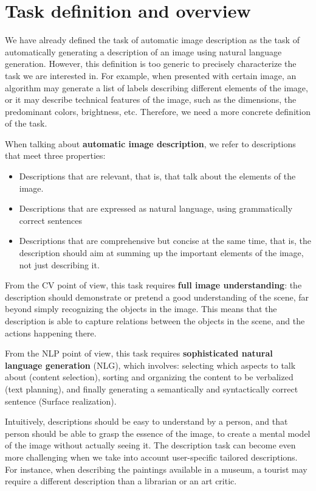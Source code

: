 \section{Task definition and overview}

We have already defined the task of automatic image description as the task of automatically generating a description of an image using natural language generation. However, this definition is too generic to precisely characterize the task we are interested in. For example, when presented with certain image, an algorithm may generate a list of labels describing different elements of the image, or it may describe technical features of the image, such as the dimensions, the predominant colors, brightness, etc. Therefore, we need a more concrete definition of the task.

When talking about \textbf{automatic image description}, we refer to descriptions that meet three properties:
\begin{itemize}
\item Descriptions that are relevant, that is, that talk about the elements of the image.
\item Descriptions that are expressed as natural language, using grammatically correct sentences
\item Descriptions that are comprehensive but concise at the same time, that is, the description should aim at summing up the important elements of the image, not just describing it.
\end{itemize}

From the CV point of view, this task requires \textbf{full image understanding}: the description should demonstrate or pretend a good understanding of the scene, far beyond simply recognizing the objects in the image. This means that the description is able to capture relations between the objects in the scene, and the actions happening there.

From the NLP point of view, this task requires \textbf{sophisticated natural language generation} (NLG), which involves: selecting which aspects to talk about (content selection), sorting and organizing the content to be verbalized (text planning), and finally generating a semantically and syntactically correct sentence (Surface realization).

Intuitively, descriptions should be easy to understand by a person, and that person should be able to grasp the essence of the image, to create a mental model of the image without actually seeing it. The description task can become even more challenging when we take into account user-specific tailored descriptions. For instance, when describing the paintings available in a museum, a tourist may require a different description than a librarian or an art critic.

